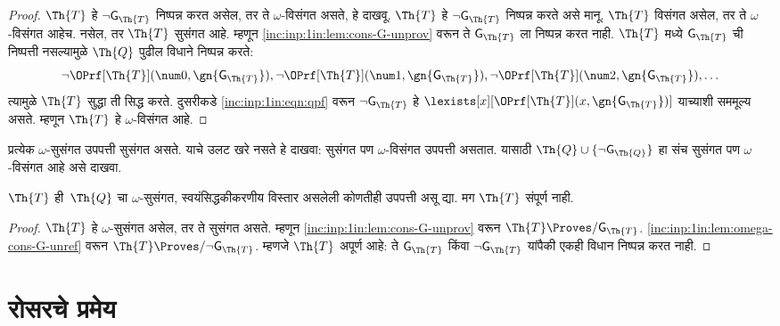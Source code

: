 \begin{proof}
$\Th{T}$ हे $\lnot \mathsf{G}_\Th{T}$
निष्पन्न करत असेल, तर ते
$\omega$-विसंगत असते, हे दाखवू.
$\Th{T}$ हे $\lnot \mathsf{G}_\Th{T}$
निष्पन्न करते असे मानू.
$\Th{T}$ विसंगत असेल, तर ते
$\omega$-विसंगत आहेच.
नसेल, तर $\Th{T}$ सुसंगत आहे.
म्हणून \ref{inc:inp:1in:lem:cons-G-unprov}
वरून ते $\mathsf{G}_\Th{T}$ ला
निष्पन्न करत नाही. $\Th{T}$
मध्ये $\mathsf{G}_\Th{T}$ ची
निष्पत्ती नसल्यामुळे
$\Th{Q}$ पुढील विधाने
निष्पन्न करते:
\[\lnot \OPrf[\Th{T}](\num 0, \gn{\mathsf{G}_\Th{T}}), \lnot \OPrf[\Th{T}](\num 1,
\gn{\mathsf{G}_\Th{T}}), \lnot \OPrf[\Th{T}](\num 2, \gn{\mathsf{G}_\Th{T}}), \dots
\]
त्यामुळे $\Th{T}$ सुद्धा ती
सिद्ध करते. दुसरीकडे
\ref{inc:inp:1in:eqn:qpf} वरून
$\lnot \mathsf{G}_\Th{T}$ हे
$\lexists[x][\OPrf[\Th{T}](x,\gn{\mathsf{G}_\Th{T}})]$
याच्याशी सममूल्य असते.
म्हणून $\Th{T}$ हे
$\omega$-विसंगत आहे.
\end{proof}

\begin{prob}
  प्रत्येक $\omega$-सुसंगत उपपत्ती
  सुसंगत असते. याचे उलट खरे नसते
  हे दाखवा: सुसंगत पण
  $\omega$-विसंगत उपपत्ती असतात.
  यासाठी $\Th{Q} \cup
  \{\lnot \mathsf{G}_\Th{Q}\}$ हा संच
  सुसंगत पण $\omega$-विसंगत
  आहे असे दाखवा.
\end{prob}

\begin{thm}
\label{inc:inp:1in:thm:first-incompleteness}
$\Th{T}$ ही~$\Th{Q}$ चा
$\omega$-सुसंगत,
स्वयंसिद्धकीकरणीय विस्तार असलेली
कोणतीही उपपत्ती असू द्या.
मग $\Th{T}$ संपूर्ण नाही.
\end{thm}

\begin{proof}
  $\Th{T}$ हे $\omega$-सुसंगत
  असेल, तर ते सुसंगत असते.
  म्हणून \ref{inc:inp:1in:lem:cons-G-unprov}
  वरून $\Th{T}
  \Proves/ \mathsf{G}_\Th{T}$.
  \ref{inc:inp:1in:lem:omega-cons-G-unref}
  वरून $\Th{T} \Proves/
  \lnot \mathsf{G}_\Th{T}$. म्हणजे
  $\Th{T}$ अपूर्ण आहे: ते
  $\mathsf{G}_\Th{T}$ किंवा
  $\lnot \mathsf{G}_\Th{T}$ यांपैकी
  एकही विधान निष्पन्न करत नाही.
\end{proof}












\section{रोसरचे प्रमेय}\label{inc:inp:ros:sec}

